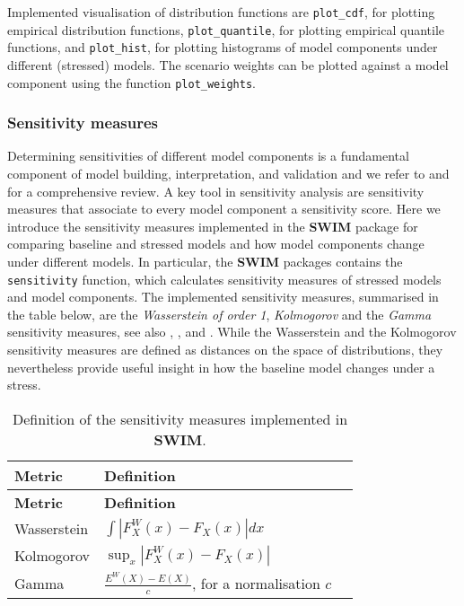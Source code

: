 \documentclass[
]{article}
\begin{document}
Implemented visualisation of distribution functions are \texttt{plot\_cdf}, for plotting empirical distribution functions, \texttt{plot\_quantile}, for plotting empirical quantile functions, and \texttt{plot\_hist}, for plotting histograms of model components under different (stressed) models. The scenario weights can be plotted against a model component using the function \texttt{plot\_weights}.

\hypertarget{sensitivity-measures}{%
\subsubsection{Sensitivity measures}\label{sensitivity-measures}}

Determining sensitivities of different model components is a fundamental component of model building, interpretation, and validation and we refer to \citet{Saltelli2008} and \citet{Borgonovo2016} for a comprehensive review. A key tool in sensitivity analysis are sensitivity measures that associate to every model component a sensitivity score. Here we introduce the sensitivity measures implemented in the \textbf{SWIM} package for comparing baseline and stressed models and how model components change under different models. In particular, the \textbf{SWIM} packages contains the \texttt{sensitivity} function, which calculates sensitivity measures of stressed models and model components. The implemented sensitivity measures, summarised in the table below, are the \emph{Wasserstein of order 1}, \emph{Kolmogorov} and the \emph{Gamma} sensitivity measures, see also \citet{Pesenti2016DM}, \citet{Pesenti2019}, and \citet{Emmer2015JR}. While the Wasserstein and the Kolmogorov sensitivity measures are defined as distances on the space of distributions, they nevertheless provide useful insight in how the baseline model changes under a stress.

\begin{longtable}[]{@{}lll@{}}
\caption{\label{tab:sensitivity} Definition of the sensitivity measures implemented in \textbf{SWIM}.}\tabularnewline
\toprule
\textbf{Metric} & \textbf{Definition} &\tabularnewline
\midrule
\endfirsthead
\toprule
\textbf{Metric} & \textbf{Definition} &\tabularnewline
\midrule
\endhead
Wasserstein & \(\int | F^W_X (x) - F_X(x)| dx\) &\tabularnewline
Kolmogorov & \(\sup_x |F^W_X (x) - F_X(x)|\) &\tabularnewline
Gamma & \(\frac{E^W(X) - E(X)}{c}\), for a normalisation \(c\) &\tabularnewline
\bottomrule
\end{longtable}
\end{document}
